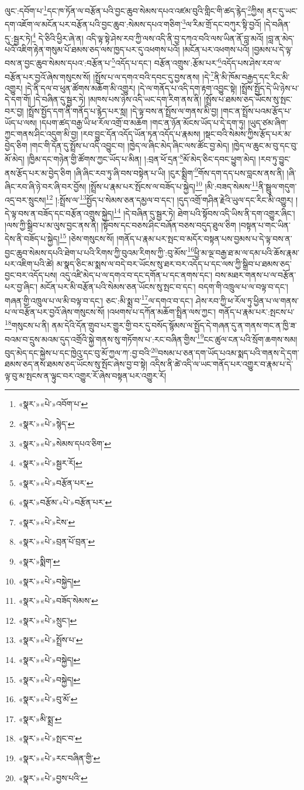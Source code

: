 ལུང་:དབོག་པ་\footnote{«སྣར་»«པེ་»འབོག་པ་}དང་ཁ་ཏོན་ལ་བརྩོན་པའི་བྱང་ཆུབ་སེམས་དཔའ་འཛམ་བུའི་གླིང་གི་ཚད་རྙེད་\footnote{«སྣར་»«པེ་»སྙེད་}ཀྱིས། ནང་དུ་ཡང་དག་འཇོག་ལ་མངོན་པར་བརྩོན་པའི་བྱང་ཆུབ་:སེམས་དཔའ་གཅིག་\footnote{«སྣར་»«པེ་»སེམས་དཔའ་ཅིག་}ལ་རིམ་གྲོ་དང་བཀུར་སྟི་བྱའོ། །དེ་བཞིན་དུ་:སྦྱར་ཏེ།\footnote{«སྣར་»«པེ་»སྦྱར་རོ།} དེ་ཅིའི་ཕྱིར་ཞེ་ན། འདི་ལྟ་སྟེ་ཤེས་རབ་ཀྱི་ལས་འདི་ནི་བྱ་དཀའ་བའི་ལས་ཡིན་ནོ་བླ་མའོ། །བླ་ན་མེད་པའོ་འཇིག་རྟེན་གསུམ་པོ་ཐམས་ཅད་ལས་ཁྱད་པར་དུ་འཕགས་པའོ། །མངོན་པར་འཕགས་པའོ། །བྱམས་པ་དེ་ལྟ་བས་ན་བྱང་ཆུབ་སེམས་དཔའ་:བརྩོན་པ་\footnote{«སྣར་»«པེ་»བརྩོན་པར་}འདོད་པ་དང་། བརྩོན་འགྲུས་:རྩོམ་པར་\footnote{«སྣར་»བརྩོམ་«པེ་»བརྩོན་པར་}འདོད་པས་ཤེས་རབ་ལ་བརྩོན་པར་བྱའོ་ཞེས་གསུངས་སོ། །སྤྲོས་པ་ལ་དགའ་བའི་དབང་དུ་བྱས་ནས། །དེ་\footnote{«སྣར་»«པེ་»ངེས་}ནི་མི་ཁོམ་བརྒྱད་དང་རིང་མི་འགྱུར། །དེ་ནི་དལ་བ་ཕུན་ཚོགས་མཆོག་མི་འགྱུར། །དེ་ལ་གནོད་པ་འདི་དག་རྟག་འབྱུང་སྟེ། །སྤྲོས་སྤྱོད་དེ་ཡི་ཉེས་པ་དེ་དག་གོ། །དེ་བཞིན་དུ་སྦྱར་ཏེ། །མཁས་པས་ཉེས་འདི་ཡང་དག་རིག་ནས་ནི། །སྤྲོས་པ་ཐམས་ཅད་ཡོངས་སུ་སྤང་བར་བྱ། །སྤྲོས་སྤྱོད་དག་ནི་གནོད་པ་རྙེད་པར་སླ། །དེ་ལྟ་བས་ན་སྤྲོས་ལ་གནས་མི་བྱ། །གང་ན་སྤྲོས་པའམ་རྩོད་པ་ཡོད་པ་ལས། །དཔག་ཚད་བརྒྱ་ཡི་ཕ་རོལ་འགྲོ་བ་མཆོག །གང་ན་ཉོན་མོངས་ཡོད་པ་དེ་དག་ཏུ། །ཡུད་ཙམ་ཞིག་ཀྱང་གནས་ཤིང་འདུག་མི་བྱ། །རབ་བྱུང་དོན་འདོད་ཡོན་ཏན་འདོད་པ་རྣམས། །སྡང་བའི་སེམས་ཀྱིས་རྩོད་པར་མ་བྱེད་ཅིག །གང་གི་དོན་དུ་སྤྲོས་པ་འདི་འབྱུང་བ། །ཁྱེད་ལ་ཞིང་མེད་ཞིང་ལས་ཚོང་བྱ་མེད། །ཁྱེད་ལ་ཆུང་མ་བུ་དང་བུ་མོ་མེད། །ཁྱིམ་དང་གཉེན་གྱི་ཚོགས་ཀྱང་ཡོད་པ་མིན། །:བྲན་ཕོ་དྲན་\footnote{«སྣར་»«པེ་»བྲན་པོ་བྲན་}མོ་མེད་ཅིང་དབང་ཕྱུག་མེད། །རབ་ཏུ་བྱུང་ནས་རྩོད་པར་མ་བྱེད་ཅིག །ཞི་ཞིང་རབ་ཏུ་ཞི་བས་བསྟེན་པ་ཡི། །ངུར་སྨྲིག་\footnote{«སྣར་»སྨིག་}གོས་དག་དད་པས་བླངས་ནས་ནི། །ཞི་ཞིང་རབ་ཞི་ཉེ་བར་ཞི་བར་བྱོས། །སྤྲོས་པ་རྣམ་པར་སྤོངས་ལ་བཟོད་པ་སྐྱེད།\footnote{«སྣར་»«པེ་»བསྐྱེད།} །མི་:བཟད་སེམས་\footnote{«སྣར་»«པེ་»བཟོད་སེམས་}ནི་སྦྲུལ་གདུག་འདྲ་བར་སྲུངས།\footnote{«སྣར་»«པེ་»སྲུང་།} །:སྤྲོས་ལ་\footnote{«སྣར་»«པེ་»སྤྲོས་པ་}སྤྱོད་པ་སེམས་ཅན་དམྱལ་བ་དང་། །དུད་འགྲོ་གཤིན་རྗེའི་ཡུལ་དང་རིང་མི་འགྱུར། །དེ་ལྟ་བས་ན་བཟོད་དང་བརྩོན་འགྲུས་སྐྱེད།\footnote{«སྣར་»«པེ་»བསྐྱེད།} །དེ་བཞིན་དུ་སྦྱར་ཏེ། ཐེག་པའི་སྟོབས་འདི་ཡིས་ནི་དག་འགྱུར་ཞིང་། །ལས་ཀྱི་སྒྲིབ་པ་མ་ལུས་བྱང་ནས་ནི། །སྟོབས་དང་བཅས་ཤིང་བཞོན་བཅས་བདུད་ཐུལ་ཅིག །བསྟན་པ་གང་ཡིན་དེས་ནི་བཟོད་པ་སྐྱེད།\footnote{«སྣར་»«པེ་»བསྐྱེད།} །ཅེས་གསུངས་སོ། །གནོད་པ་རྣམ་པར་སྤང་བ་མདོར་བསྟན་པས་བྱམས་པ་དེ་ལྟ་བས་ན་བྱང་ཆུབ་སེམས་དཔའི་ཐེག་པ་པའི་རིགས་ཀྱི་བུའམ་རིགས་ཀྱི་:བུ་མོས་\footnote{«སྣར་»«པེ་»བུ་མོ་}ཕྱི་མ་ལྔ་བརྒྱ་ཐ་མ་ལ་དམ་པའི་ཆོས་རྣམ་པར་འཇིག་པའི་ཚེ། མ་སྣད་ཅིང་མ་སྨས་ལ་བདེ་བར་ཡོངས་སུ་ཐར་བར་འདོད་པ་དང་ལས་ཀྱི་སྒྲིབ་པ་ཐམས་ཅད་བྱང་བར་འདོད་པས། འདུ་འཛི་མེད་པ་ལ་དགའ་བ་དང་དགོན་པ་དང་ནགས་དང་། བས་མཐར་གནས་པ་ལ་བརྩོན་པར་བྱ་ཞིང་། མངོན་པར་མི་བརྩོན་པའི་སེམས་ཅན་ཡོངས་སུ་སྤང་བ་དང་། བདག་གི་འཁྲུལ་པ་ལ་བལྟ་བ་དང་། གཞན་གྱི་འཁྲུལ་པ་ལ་མི་བལྟ་བ་དང་། ཅང་:མི་སྨྲ་བ་\footnote{«སྣར་»མི་སྨྲ་}ལ་དགའ་བ་དང་། ཤེས་རབ་ཀྱི་ཕ་རོལ་ཏུ་ཕྱིན་པ་ལ་གནས་པ་ལ་བརྩོན་པར་བྱའོ་ཞེས་གསུངས་སོ། །འཕགས་པ་དཀོན་མཆོག་སྤྲིན་ལས་ཀྱང་། གནོད་པ་རྣམ་པར་:སྤངས་པ་\footnote{«སྣར་»«པེ་»སྤང་བ་}གསུངས་པ་ནི། ནམ་དེའི་དོན་གྲུབ་པར་གྱུར་གྱི་བར་དུ་བསོད་སྙོམས་ལ་སྤྱོད་དེ་གཞན་དུ་ན་གནས་གང་ན་ཁྱི་ཟ་བའམ་བ་དྲུས་མའམ་དུད་འགྲོའི་སྐྱེ་གནས་སུ་གཏོགས་པ་:རང་བཞིན་གྱིས་\footnote{«སྣར་»«པེ་»རང་བཞིན་གྱི་}ངང་ཚུལ་ངན་པའི་སྲོག་ཆགས་སམ། བུད་མེད་དང་སྐྱེས་པ་དང་ཁྱེའུ་དང་བུ་མོ་ཀྱལ་ཀ་:བྱ་བའི་\footnote{«སྣར་»«པེ་»བྱས་པའི་}བསམ་པ་ཅན་དག་ཡོད་པའམ་སྨད་པའི་གནས་དེ་དག་ཐམས་ཅད་ནས་ཐམས་ཅད་ཡོངས་སུ་སྤོང་ཞེས་བྱ་བ་སྟེ། འདིས་ནི་ཚེ་འདི་ལ་ཡང་གནོད་པར་འགྱུར་བ་རྣམ་པ་དེ་ལྟ་བུ་མ་སྤངས་ན་ལྟུང་བར་འགྱུར་རོ་ཞེས་བསྟན་པར་འགྱུར་རོ། 